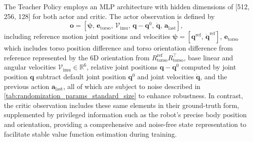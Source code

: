The Teacher Policy employs an MLP architecture with hidden dimensions of [512, 256, 128] for both actor and critic. The actor observation is defined by
\[
\mathbf{o}=[\boldsymbol{\psi},\,\mathbf{e}_{\text{torso}},\,\mathcal{V}_{\text{imu}},\,\boldsymbol{q}- \boldsymbol{q}^{0},\,\dot{\boldsymbol{q}},\,\mathbf{a}_{\text{last}}],
\]
including reference motion joint positions and velocities $\boldsymbol{\psi}=[\boldsymbol{q}^{\text{ref}},\,\dot{\boldsymbol{q}}^{\text{ref}}]$, $\mathbf{e}_{\text{torso}}$ which includes torso position difference and torso orientation difference from reference represented by the 6D orientation from $R_{\text{torso}}^{\text{ref}}R_{\text{torso}}^{\top}$, base linear and angular velocities $\mathcal{V}_{\text{imu}}\in\mathbb{R}^{6}$, relative joint positions $\boldsymbol{q}- \boldsymbol{q}^{0}$ computed by joint position $\boldsymbol{q}$ subtract default joint position $\boldsymbol{q}^{0}$ and joint velocities $\dot{\boldsymbol{q}}$, and the previous action $\mathbf{a}_{\text{last}}$, all of which are subject to noise described in \cref{tab:randomization_params_standard_size} to enhance robustness. In contrast, the critic observation includes these same elements in their ground-truth form, supplemented by privileged information such as the robot's precise body position and orientation, providing a comprehensive and noise-free state representation to facilitate stable value function estimation during training. 



